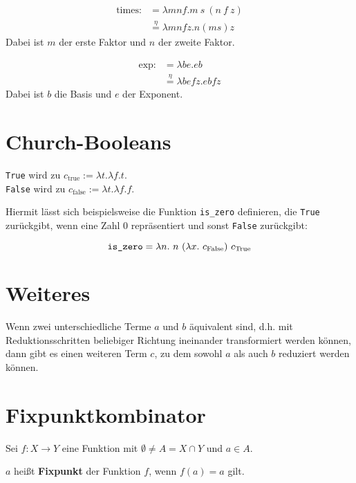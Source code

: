 \begin{beispiel}[Multiplikation]
    \begin{align*}
     \text{times} :&= \lambda m n f. m~s~(n~f~z)\\
                   &\overset{\eta}{=} \lambda m n f z. n (m s) z
    \end{align*}
    Dabei ist $m$ der erste Faktor und $n$ der zweite Faktor.
\end{beispiel}

\begin{beispiel}[Potenz]
    \begin{align*}
     \text{exp} :&= \lambda b e. eb\\
                   &\overset{\eta}{=} \lambda b e f z. e b f z
    \end{align*}
    Dabei ist $b$ die Basis und $e$ der Exponent.
\end{beispiel}

\section{Church-Booleans}
\begin{definition}%
    \texttt{True} wird zu $c_{\text{true}} := \lambda t. \lambda f. t$.\\
    \texttt{False} wird zu $c_{\text{false}} := \lambda t. \lambda f. f$.
\end{definition}

Hiermit lässt sich beispielsweise die Funktion \texttt{is\_zero} definieren, die
\texttt{True} zurückgibt, wenn eine Zahl $0$ repräsentiert und sonst \texttt{False}
zurückgibt:

\[ \text{\texttt{is\_zero}} = \lambda n.\ n\ (\lambda x.\ c_{\text{False}})\ c_{\text{True}}\]

\section{Weiteres}
\begin{satz}
    Wenn zwei unterschiedliche Terme $a$ und $b$ äquivalent sind, d.h. mit Reduktionsschritten beliebiger Richtung ineinander transformiert werden können, dann gibt es einen weiteren Term $c$, zu dem sowohl $a$ als auch $b$ reduziert werden können.
\end{satz}

\section{Fixpunktkombinator}
\begin{definition}[Fixpunkt]%
    Sei $f: X \rightarrow Y$ eine Funktion mit $\emptyset \neq A = X \cap Y$ und
    $a \in A$.

    $a$ heißt \textbf{Fixpunkt} der Funktion $f$, wenn $f(a) = a$ gilt.
\end{definition}

